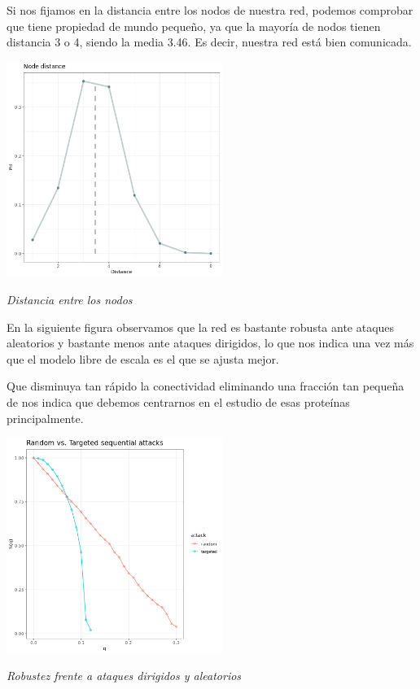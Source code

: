 Si nos fijamos en la distancia entre los nodos de nuestra red, podemos comprobar que tiene propiedad de mundo pequeño, ya que la mayoría de nodos tienen distancia 3 o 4, siendo la media 3.46.
Es decir, nuestra red está bien comunicada.

\begin{center}

\includegraphics[width=70mm,scale=1.2]{report/figures/Node_distance.png}

\caption{\textit{Distancia entre los nodos}}

\end{center}

En la siguiente figura observamos que la red es bastante robusta ante ataques aleatorios y bastante menos ante ataques dirigidos, lo que nos indica una vez más que el modelo libre de escala es el que se ajusta mejor.

Que disminuya tan rápido la conectividad eliminando una fracción tan pequeña de nos indica que debemos centrarnos en el estudio de esas proteínas principalmente.

\begin{center}

\includegraphics[width=70mm,scale=1.2]{report/figures/sequential_attacks.png}

\caption{\textit{Robustez frente a ataques dirigidos y aleatorios}}

\end{center}

